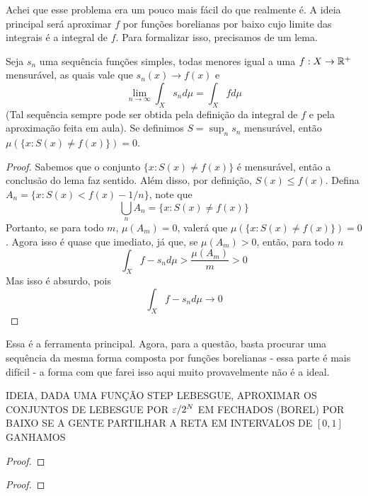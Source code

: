 \begin{problem}
    \label{prob:l3:4}
\end{problem}
Achei que esse problema era um pouco mais fácil do que realmente é. A ideia principal será 
aproximar $f$ por funções borelianas por baixo cujo limite das integrais é a integral de $f$.
Para formalizar isso, precisamos de um lema.

\begin{lemma}
    Seja $s_n$ uma sequência funções simples, todas menores igual a uma $f: X \rightarrow \mathbb{R}^+$ mensurável,
    as quais vale que $s_n(x) \to f(x)$ e 
    $$\lim_{n \to \infty} \int_X s_n d\mu = \int_X f d\mu$$
    (Tal sequência sempre pode ser obtida pela definição da integral de $f$ e pela aproximação feita em aula). 
    Se definimos $S = \sup_n s_n$ mensurável, então $\mu(\{x : S(x) \neq f(x)\}) = 0$.
\end{lemma}
\begin{proof}
    Sabemos que o conjunto $\{x : S(x) \neq f(x)\}$ é mensurável, então a conclusão do lema faz sentido.
    Além disso, por definição, $S(x) \leq f(x)$. Defina $A_n = \{x : S(x) < f(x) - 1/n\}$, note que
    $$\bigcup_n A_n = \{x : S(x) \neq f(x)\}$$
    Portanto, se para todo $m$, $\mu(A_m) = 0$, valerá que $\mu(\{x : S(x) \neq f(x)\}) = 0$. Agora isso é 
    quase que imediato, já que, se $\mu(A_m) > 0$, então, para todo $n$
    $$\int_{X} f - s_n d\mu > \frac{\mu(A_m)}{m} > 0$$
    Mas isso é absurdo, pois $$\int_X f - s_n d\mu \to 0$$
\end{proof}
Essa é a ferramenta principal. Agora, para a questão, basta procurar uma sequência da mesma forma composta por funções borelianas 
- essa parte é mais difícil - a forma com que farei isso aqui muito provavelmente não é a ideal.

IDEIA, DADA UMA FUNÇÃO STEP LEBESGUE, APROXIMAR OS CONJUNTOS DE LEBESGUE  POR $\varepsilon/2^N$ EM FECHADOS (BOREL) POR BAIXO
SE A GENTE PARTILHAR A RETA EM INTERVALOS DE $[0,1]$ GANHAMOS
\begin{problem}
    \label{prob:l3:5}
\end{problem}
\begin{proof}
    
\end{proof}

\begin{problem}
    \label{prob:l3:6}
\end{problem}
\begin{proof}
    
\end{proof}

